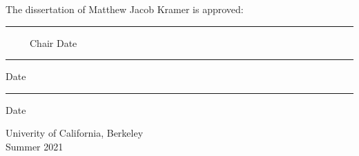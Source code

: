 \MyDoubleSpacing

\begin{minipage}{0.85\linewidth}
  \begin{center}
    The dissertation of Matthew Jacob Kramer is approved:

    \vspace{3.5\baselineskip}
    \hrule\vspace{0.25\baselineskip}
    {\small\ \ \ \ \ Chair \hfill Date}
    \vspace{3\baselineskip}
    \hrule\vspace{0.25\baselineskip}
    {\small\hfill Date}
    \vspace{3\baselineskip}
    \hrule\vspace{0.25\baselineskip}
    {\small\hfill Date}
    \vspace{2.5\baselineskip}   %

    Univerity of California, Berkeley\\
    \vspace{1.5\baselineskip}
    Summer 2021
  \end{center}
\end{minipage}

\clearpage
